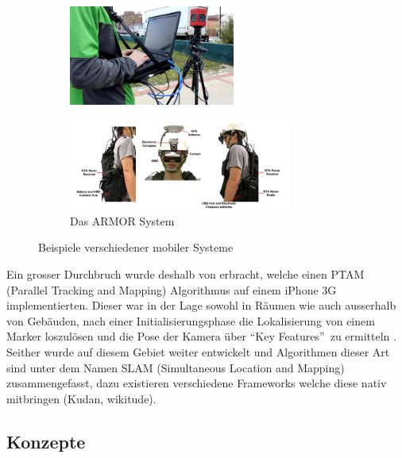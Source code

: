 \documentclass[a4paper]{scrreprt}
\begin{document}
\begin{figure}[h!]
	\begin{subfigure}[b]{0.45\textwidth}
		\centering
		\includegraphics[keepaspectratio, width=0.6\textwidth]{LiveMobilePanoramicAR.png}
		\caption{\parencite{Cote2013}}
	\end{subfigure}
	\quad
	\begin{subfigure}[b]{0.45\textwidth}
		\centering
		\includegraphics[keepaspectratio, width=0.8\textwidth]{ARMOR_System2013.png}
		\caption{Das ARMOR System \parencite{Dong2013}}
	\end{subfigure}
	\caption{Beispiele verschiedener mobiler Systeme}
	\label{fig:MobileSysteme}
\end{figure}

Ein grosser Durchbruch wurde deshalb von \citeauthor{Klein2009} erbracht, welche einen PTAM (Parallel Tracking and Mapping) Algorithmus auf einem iPhone 3G implementierten. Dieser war in der Lage sowohl in Räumen wie auch ausserhalb von Gebäuden, nach einer Initialisierungsphase die Lokalisierung von einem Marker loszulösen und die Pose der Kamera über \textquotedblleft Key Features\textquotedblright\ zu ermitteln \parencite{Klein2009}. Seither wurde auf diesem Gebiet weiter entwickelt und Algorithmen dieser Art sind unter dem Namen SLAM (Simultaneous Location and Mapping) zusammengefasst, dazu existieren verschiedene Frameworks welche diese nativ mitbringen (Kudan, wikitude).

\subsection{Konzepte}
\end{document}
